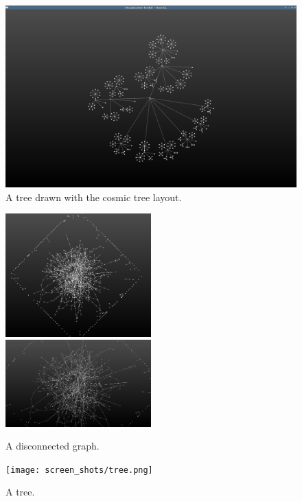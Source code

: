 \documentclass[11pt]{article}
\begin{document}
    \begin{figure}[H]
        \centering
        \includegraphics[width=\textwidth]{screen_shots/cosmic_tree.png}
        \caption{A tree drawn with the cosmic tree layout.}
    \end{figure}
    \begin{figure}[H]
        \centering
        \includegraphics[width=0.5\textwidth]{screen_shots/disconnected.png}
        \includegraphics[width=0.5\textwidth]{screen_shots/disconnected_zoomed.png}
        \caption{A disconnected graph.}
    \end{figure}
    \begin{figure}[H]
        \centering
        \texttt{[image: screen\_shots/tree.png]}
        \caption{A tree.}
    \end{figure}
\end{document}
